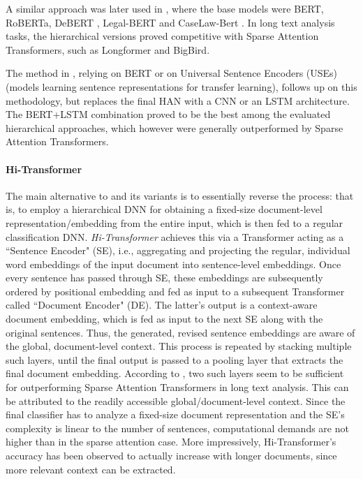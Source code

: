 \documentclass[preprint,review,10pt]{elsarticle}
\begin{document}
	A similar approach was later used in \cite{glue_gunner}, where the base models were BERT, RoBERTa, DeBERT \cite{yanguang}, Legal-BERT \cite{ion6} and CaseLaw-Bert \cite{zheng}. In long text analysis tasks, the hierarchical versions proved competitive with Sparse Attention Transformers, such as Longformer and BigBird.
	
	The method in \cite{khandve}, relying on BERT or on Universal Sentence Encoders (USEs) \cite{use} (models learning sentence representations for transfer learning), follows up on this methodology, but replaces the final HAN with a CNN or an LSTM architecture. The BERT+LSTM combination proved to be the best among the evaluated hierarchical approaches, which however were generally outperformed by Sparse Attention Transformers.
	
	\paragraph{Hi-Transformer} The main alternative to \cite{glue_gunner} and its variants is to essentially reverse the process: that is, to employ a hierarchical DNN for obtaining a fixed-size document-level representation/embedding from the entire input, which is then fed to a regular classification DNN. \textit{Hi-Transformer} \cite{qi} achieves this via a Transformer acting as a ``Sentence Encoder" (SE), i.e., aggregating and projecting the regular, individual word embeddings of the input document into sentence-level embeddings. Once every sentence has passed through SE, these embeddings are subsequently ordered by positional embedding and fed as input to a subsequent Transformer called ``Document Encoder" (DE). The latter's output is a context-aware document embedding, which is fed as input to the next SE along with the original sentences. Thus, the generated, revised sentence embeddings are aware of the global, document-level context. This process is repeated by stacking multiple such layers, until the final output is passed to a pooling layer that extracts the final document embedding. According to \cite{qi}, two such layers seem to be sufficient for outperforming Sparse Attention Transformers in long text analysis. This can be attributed to the readily accessible global/document-level context. Since the final classifier has to analyze a fixed-size document representation and the SE's complexity is linear to the number of sentences, computational demands are not higher than in the sparse attention case. More impressively, Hi-Transformer's accuracy has been observed to actually increase with longer documents, since more relevant context can be extracted.
	
\end{document}
